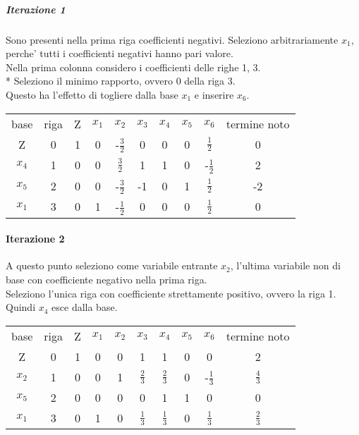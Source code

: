 \subparagraph{Iterazione 1}

Sono presenti nella prima riga coefficienti negativi. Seleziono arbitrariamente $x_1$, perche' tutti i coefficienti negativi hanno pari valore. \\

Nella prima colonna considero i coefficienti delle righe 1, 3. \\*
Seleziono il minimo rapporto, ovvero 0 della riga 3. \\

Questo ha l'effetto di togliere dalla base $x_1$ e inserire $x_6$.

\begin{center}
    \begin{tabular}{|c|c|c|c|c|c|c|c|c|c|}
        base & riga & Z & $x_1$ & $x_2$ & $x_3$ & $x_4$ & $x_5$ & $x_6$ & termine noto \\
        Z & 0 & 1 &  0 & -$\frac 3 2$ &  0 &  0 &  0 &  $\frac 1 2$ &  0 \\
        $x_4$ & 1 & 0 &  0 &  $\frac 3 2$ &  1 &  1 &  0 & -$\frac 1 2$ &  2 \\
        $x_5$ & 2 & 0 &  0 & -$\frac 3 2$ & -1 &  0 &  1 &  $\frac 1 2$ & -2 \\
        $x_1$ & 3 & 0 &  1 & -$\frac 1 2$ &  0 &  0 &  0 &  $\frac 1 2$ &  0
    \end{tabular}
\end{center}

\paragraph{Iterazione 2}

A questo punto seleziono come variabile entrante $x_2$, l'ultima variabile non di base con coefficiente negativo nella prima riga. \\

Seleziono l'unica riga con coefficiente strettamente positivo, ovvero la riga 1. Quindi $x_4$ esce dalla base. \\

\begin{center}
    \begin{tabular}{|c|c|c|c|c|c|c|c|c|c|}
        base  & riga & Z & $x_1$ & $x_2$        & $x_3$        & $x_4$        & $x_5$ & $x_6$        & termine noto \\
        Z     & 0    & 1 &  0    & 0            &  1           &  1           &  0    & 0            & 2 \\
        $x_2$ & 1    & 0 &  0    & 1            &  $\frac 2 3$ &  $\frac 2 3$ &  0    & -$\frac 1 3$ & $\frac 4 3$ \\
        $x_5$ & 2    & 0 &  0    & 0            &  0           &  1           &  1    & 0            &  0 \\
        $x_1$ & 3    & 0 &  1    & 0            &  $\frac 1 3$ &  $\frac 1 3$ &  0    &  $\frac 1 3$ & $\frac 2 3$
    \end{tabular}
\end{center}

